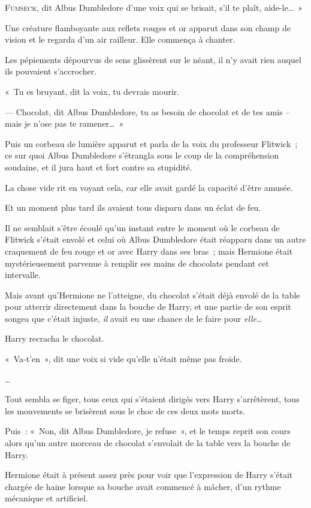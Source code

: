 
\lettrine[ante=«~]{F}{umseck}, dit Albus Dumbledore d'une voix qui se brisait, s'il te plaît, aide-le…~»

Une créature flamboyante aux reflets rouges et or apparut dans son champ de vision et le regarda d'un air railleur.
Elle commença à chanter.

Les pépiements dépourvus de sens glissèrent sur le néant, il n'y avait rien auquel ils pouvaient s'accrocher.

«~Tu es bruyant, dit la voix, tu devrais mourir.

--- Chocolat, dit Albus Dumbledore, tu as besoin de chocolat et de tes amis -- mais je n'ose pas te ramener…~»

Puis un corbeau de lumière apparut et parla de la voix du professeur Flitwick~; ce sur quoi Albus Dumbledore s'étrangla sous le coup de la compréhension soudaine, et il jura haut et fort contre sa stupidité.

La chose vide rit en voyant cela, car elle avait gardé la capacité d'être amusée.

\later

Et un moment plus tard ils avaient tous disparu dans un éclat de feu.

Il ne semblait s'être écoulé qu'un instant entre le moment où le corbeau de Flitwick s'était envolé et celui où Albus Dumbledore était réapparu dans un autre craquement de feu rouge et or avec Harry dans ses bras~; mais Hermione était mystérieusement parvenue à remplir ses mains de chocolats pendant cet intervalle.

Mais avant qu'Hermione ne l'atteigne, du chocolat s'était déjà envolé de la table pour atterrir directement dans la bouche de Harry, et une partie de son esprit songea que c'était injuste, \emph{il} avait eu une chance de le faire pour \emph{elle}…

Harry recracha le chocolat.

«~Va-t'en~», dit une voix si vide qu'elle n'était même pas froide.

…

Tout sembla se figer, tous ceux qui s'étaient dirigés vers Harry s'arrêtèrent, tous les mouvements se brisèrent sous le choc de ces deux mots morts.

Puis~: «~Non, dit Albus Dumbledore, je refuse~», et le temps reprit son cours alors qu'un autre morceau de chocolat s'envolait de la table vers la bouche de Harry.

Hermione était à présent assez près pour voir que l'expression de Harry s'était chargée de haine lorsque sa bouche avait commencé à mâcher, d'un rythme mécanique et artificiel.


